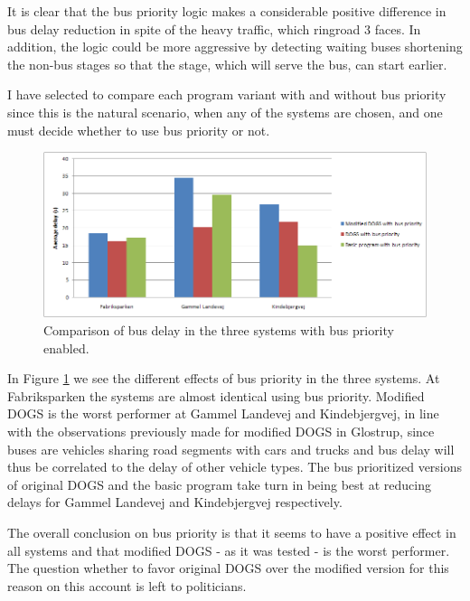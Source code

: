 It is clear that the bus priority logic makes a considerable positive difference in bus delay reduction in spite of the heavy traffic, which ringroad 3 faces. In addition, the logic could be more aggressive by detecting waiting buses shortening the non-bus stages so that the stage, which will serve the bus, can start earlier.

I have selected to compare each program variant with and without bus priority since this is the natural scenario, when any of the systems are chosen, and one must decide whether to use bus priority or not. 

\begin{figure}[htbp]
\centering
\includegraphics[width=\singleimwidth]{delay_bus_priority-all.png}
\caption{Comparison of bus delay in the three systems with bus priority enabled.}
\label{fig:buscomp}
\end{figure}

In Figure \ref{fig:buscomp} we see the different effects of bus priority in the three systems. At Fabriksparken the systems are almost identical using bus priority. Modified DOGS is the worst performer at Gammel Landevej and Kindebjergvej, in line with the observations previously made for modified DOGS in Glostrup, since buses are vehicles sharing road segments with cars and trucks and bus delay will thus be correlated to the delay of other vehicle types. The bus prioritized versions of original DOGS and the basic program take turn in being best at reducing delays for Gammel Landevej and Kindebjergvej respectively. 

The overall conclusion on bus priority is that it seems to have a positive effect in all systems and that modified DOGS - as it was tested - is the worst performer. The question whether to favor original DOGS over the modified version for this reason on this account is left to politicians.
